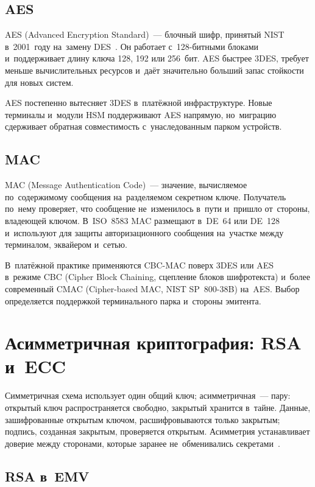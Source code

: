\subsection*{AES}

AES (Advanced Encryption Standard)~--- блочный шифр, принятый NIST в~2001~году
на~замену DES~\cite{nist-fips-197}. Он работает с~128-битными блоками
и~поддерживает длину ключа 128, 192 или 256~бит. AES быстрее 3DES, требует
меньше вычислительных ресурсов и~даёт значительно больший запас стойкости для
новых систем.

AES постепенно вытесняет 3DES в~платёжной инфраструктуре. Новые терминалы
и~модули HSM поддерживают AES напрямую, но~миграцию сдерживает обратная
совместимость с~унаследованным парком устройств.

\subsection*{MAC}

MAC (Message Authentication Code)~--- значение, вычисляемое по~содержимому
сообщения на~разделяемом секретном ключе. Получатель по~нему проверяет, что
сообщение не~изменилось в~пути и~пришло от~стороны, владеющей ключом.
В~ISO~8583 MAC размещают в~DE~64 или DE~128 и~используют для защиты
авторизационного сообщения на~участке между терминалом, эквайером и~сетью.

В~платёжной практике применяются CBC-MAC поверх 3DES или AES
в~режиме CBC (Cipher Block Chaining, сцепление блоков шифротекста) и~более
современный CMAC (Cipher-based MAC, NIST SP~800-38B) на~AES. Выбор определяется
поддержкой терминального парка и~стороны эмитента.

\FloatBarrier
\section{Асимметричная криптография: RSA и~ECC}\label{sec:crypto-asymmetric}

Симметричная схема использует один общий ключ; асимметричная~--- пару:
открытый ключ распространяется свободно, закрытый хранится в~тайне. Данные,
зашифрованные открытым ключом, расшифровываются только закрытым; подпись,
созданная закрытым, проверяется открытым. Асимметрия устанавливает доверие
между сторонами, которые заранее не~обменивались секретами~\cite{emvco-book2}.

\subsection*{RSA в~EMV}

